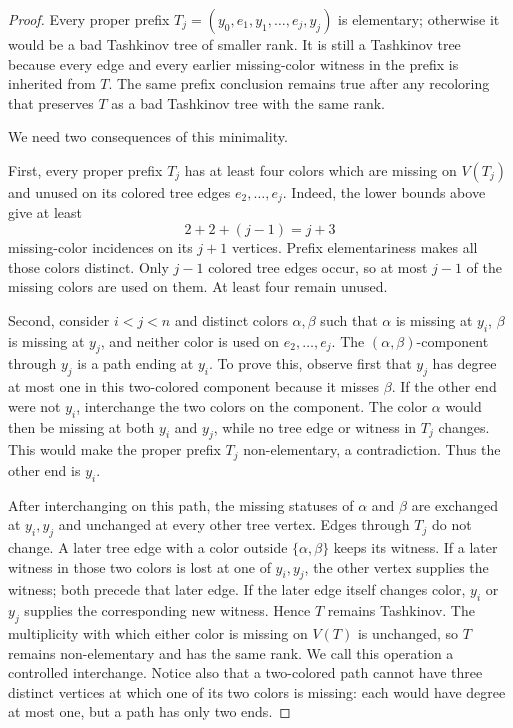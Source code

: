 \begin{proof}
Every proper prefix $T_j=(y_0,e_1,y_1,\ldots,e_j,y_j)$ is elementary;
otherwise it would be a bad Tashkinov tree of smaller rank.  It is still a
Tashkinov tree because every edge and every earlier missing-color witness in
the prefix is inherited from $T$.  The same prefix conclusion remains true
after any recoloring that preserves $T$ as a bad Tashkinov tree with the same
rank.

We need two consequences of this minimality.

First, every proper prefix $T_j$ has at least four colors which are missing
on $V(T_j)$ and unused on its colored tree edges $e_2,\ldots,e_j$.  Indeed,
the lower bounds above give at least
\[
  2+2+(j-1)=j+3
\]
missing-color incidences on its $j+1$ vertices.  Prefix elementariness makes
all those colors distinct.  Only $j-1$ colored tree edges occur, so at most
$j-1$ of the missing colors are used on them.  At least four remain unused.

Second, consider $i<j<n$ and distinct colors $\alpha,\beta$ such that
$\alpha$ is missing at $y_i$, $\beta$ is missing at $y_j$, and neither
color is used on $e_2,\ldots,e_j$.  The $(\alpha,\beta)$-component through
$y_j$ is a path ending at $y_i$.  To prove this, observe first that $y_j$
has degree at most one in this two-colored component because it misses
$\beta$.  If the other end were not $y_i$, interchange the two colors on
the component.  The color $\alpha$ would then be missing at both $y_i$ and
$y_j$, while no tree edge or witness in $T_j$ changes.  This would make the
proper prefix $T_j$ non-elementary, a contradiction.  Thus the other end is
$y_i$.

After interchanging on this path, the missing statuses of $\alpha$ and
$\beta$ are exchanged at $y_i,y_j$ and unchanged at every other tree
vertex.  Edges through $T_j$ do not change.  A later tree edge with a color
outside $\{\alpha,\beta\}$ keeps its witness.  If a later witness in those
two colors is lost at one of $y_i,y_j$, the other vertex supplies the
witness; both precede that later edge.  If the later edge itself changes
color, $y_i$ or $y_j$ supplies the corresponding new witness.  Hence $T$
remains Tashkinov.  The multiplicity with which either color is missing on
$V(T)$ is unchanged, so $T$ remains non-elementary and has the same rank.
We call this operation a controlled interchange.  Notice also that a
two-colored path cannot have three distinct vertices at which one of its two
colors is missing: each would have degree at most one, but a path has only
two ends.


\end{proof}
